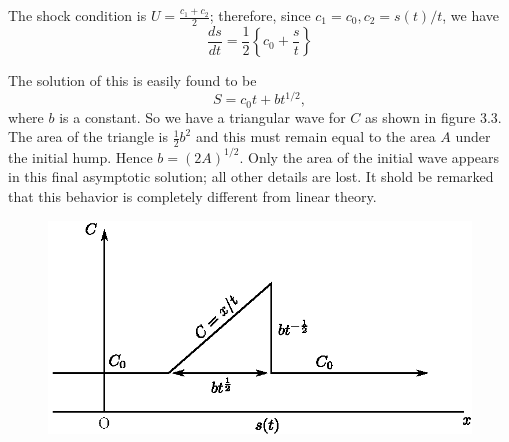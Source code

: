 The shock condition is $U=\frac{c_1+c_2}{2}$; therefore, since $c_1=c_0,c_2=s(t)/t$, we have 
\begin{equation}
\frac{ds}{dt}=\frac{1}{2}\left\{c_0+\frac{s}{t}\right\} \tag{3.12}\label{chap3:eq3.12} 
\end{equation}

The solution of this is easily found to be 
$$
S=c_0t+bt^{1/2},
$$
where $b$ is a constant. So we have a triangular wave for $C$ as shown in figure 3.3. The area of the triangle is $\frac{1}{2}b^2$ and this must remain equal to the area $A$ under the initial hump. Hence $b=(2A)^{1/2}$. Only the area of the initial wave appears in this final asymptotic solution; all other details are lost. It shold be remarked that this behavior is completely different from linear theory.
\begin{figure}[H]
\centering
\includegraphics{figures/fig61-3.3.eps}
\caption{}
\label{chap1:fig3.3}
\end{figure}


\bigskip

